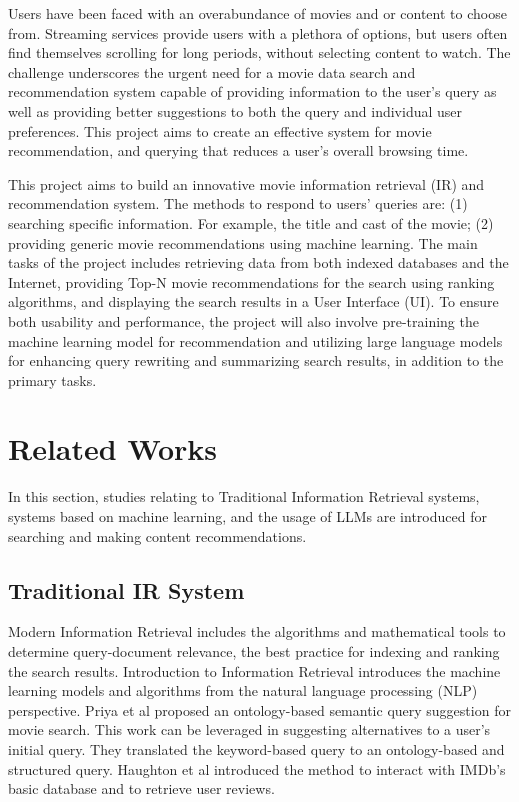 \documentclass[journal]{IEEEtran}
\begin{document}
Users have been faced with an overabundance of movies and or content to choose from. Streaming services provide users with a plethora of options, but users often find themselves scrolling for long periods, without selecting content to watch. The challenge underscores the urgent need for a movie data search and recommendation system capable of providing information to the user’s query as well as providing better suggestions to both the query and individual user preferences. This project aims to create an effective system for movie recommendation, and querying that reduces a user's overall browsing time.

This project aims to build an innovative movie information retrieval (IR) and recommendation system. The methods to respond to users’ queries are: (1) searching specific information. For example, the title and cast of the movie; (2) providing generic movie recommendations using machine learning. The main tasks of the project includes retrieving data from both indexed databases and the Internet, providing Top-N movie recommendations for the search using ranking algorithms, and displaying the search results in a User Interface (UI). To ensure both usability and performance, the project will also involve pre-training the machine learning model for recommendation and utilizing large language models for enhancing query rewriting and summarizing search results, in addition to the primary tasks. 

\section{Related Works}
In this section, studies relating to Traditional Information Retrieval systems, systems based on machine learning, and the usage of LLMs are introduced for searching and making content recommendations.

\subsection{Traditional IR System}
Modern Information Retrieval\cite{RN15} includes the algorithms and mathematical tools to determine query-document relevance, the best practice for indexing and ranking the search results. Introduction to Information Retrieval\cite{manning2008introduction} introduces the machine learning models and algorithms from the natural language processing (NLP) perspective. Priya et al\cite{6508326} proposed an ontology-based semantic query suggestion for movie search. This work can be leveraged in suggesting alternatives to a user’s initial query. They translated the keyword-based query to an ontology-based and structured query. Haughton et al\cite{RN16} introduced the method to interact with IMDb’s basic database and to retrieve user reviews. 
\end{document}
